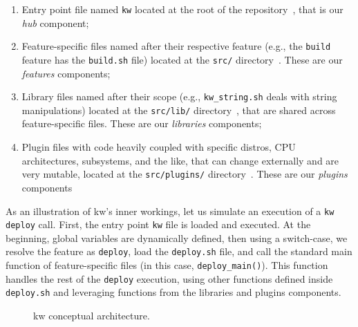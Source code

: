 \begin{enumerate}
	\item Entry point file named \texttt{kw} located at the root of the
	repository~\cite{kworkflow-entrypoint}, that is our \textit{hub} component;
	\item Feature-specific files named after their respective feature (e.g., the
	\texttt{build} feature has the \texttt{build.sh} file) located at the
	\texttt{src/} directory~\cite{kworkflow-features}. These are our
	\textit{features} components;
	\item Library files named after their scope (e.g., \texttt{kw\_string.sh}
	deals with string manipulations) located at the \texttt{src/lib/}
	directory~\cite{kworkflow-libraries}, that are shared across
	feature-specific files. These are our \textit{libraries} components;
	\item Plugin files with code heavily coupled with specific distros, CPU
	architectures, subsystems, and the like, that can change externally and are
	very mutable, located at the \texttt{src/plugins/}
	directory~\cite{kworkflow-plugins}.  These are our \textit{plugins}
	components
\end{enumerate}


As an illustration of kw's inner workings, let us simulate an execution of a
\texttt{kw deploy} call. First, the entry point \texttt{kw} file is loaded and
executed. At the beginning, global variables are dynamically defined, then using
a switch-case, we resolve the feature as \texttt{deploy}, load the
\texttt{deploy.sh} file, and call the standard main function of feature-specific
files (in this case, \texttt{deploy\_main()}). This function handles the rest of
the \texttt{deploy} execution, using other functions defined inside
\texttt{deploy.sh} and leveraging functions from the libraries and plugins
components.

\begin{figure}[htbp]
    \centering
    \caption{kw conceptual architecture.}
    \label{fig:kw-arch}
\end{figure}

